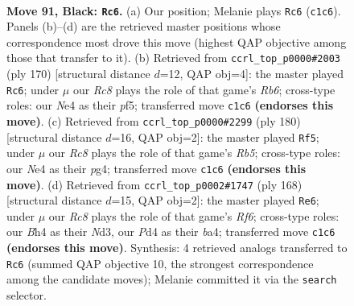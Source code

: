 \documentclass[11pt]{article}
\begin{document}
\clearpage

\begin{figure}[p]\centering
\begin{subfigure}{0.46\textwidth}\centering
\resizebox{\linewidth}{!}{%
\newchessgame
\chessboard[
  setfen={R7/8/4k2p/4p3/1K1pn2b/8/8/2r5 b - - 1 91},
  showmover=false,
  pgfstyle=straightmove, color=movearrow, markmove={c1-c6}
]}
\caption{}
\end{subfigure}\hfill
\begin{subfigure}{0.46\textwidth}\centering
\resizebox{\linewidth}{!}{%
\newchessgame
\chessboard[
  setfen={8/6k1/1R6/5p2/5P2/4P3/5K2/r7 w - - 49 86},
  showmover=false,
  pgfstyle=straightmove, color=movearrow, markmove={b6-c6}
]}
\caption{}
\end{subfigure}
\\[4pt]
\begin{subfigure}{0.46\textwidth}\centering
\resizebox{\linewidth}{!}{%
\newchessgame
\chessboard[
  setfen={8/8/7k/1R6/6p1/4K1P1/5P2/r7 w - - 86 91},
  showmover=false,
  pgfstyle=straightmove, color=movearrow, markmove={b5-f5}
]}
\caption{}
\end{subfigure}\hfill
\begin{subfigure}{0.46\textwidth}\centering
\resizebox{\linewidth}{!}{%
\newchessgame
\chessboard[
  setfen={8/2k5/5R2/8/bPK5/P2N4/8/7r w - - 35 85},
  showmover=false,
  pgfstyle=straightmove, color=movearrow, markmove={f6-e6}
]}
\caption{}
\end{subfigure}
\caption{\textbf{Move 91, Black: \texttt{Rc6}.} (a) Our position; Melanie plays \texttt{Rc6} (\texttt{c1c6}). Panels (b)--(d) are the retrieved master positions whose correspondence most drove this move (highest QAP objective among those that transfer to it). (b) Retrieved from \texttt{ccrl\_top\_p0000\#2003} (ply 170) [structural distance $d$=12, QAP obj=4]: the master played \texttt{Rc6}; under $\mu$ our \emph{Rc8} plays the role of that game's \emph{Rb6}; cross-type roles: our \emph{N}e4 as their \emph{p}f5; transferred move \texttt{c1c6} \textbf{(endorses this move)}. (c) Retrieved from \texttt{ccrl\_top\_p0000\#2299} (ply 180) [structural distance $d$=16, QAP obj=2]: the master played \texttt{Rf5}; under $\mu$ our \emph{Rc8} plays the role of that game's \emph{Rb5}; cross-type roles: our \emph{N}e4 as their \emph{p}g4; transferred move \texttt{c1c6} \textbf{(endorses this move)}. (d) Retrieved from \texttt{ccrl\_top\_p0002\#1747} (ply 168) [structural distance $d$=15, QAP obj=2]: the master played \texttt{Re6}; under $\mu$ our \emph{Rc8} plays the role of that game's \emph{Rf6}; cross-type roles: our \emph{B}h4 as their \emph{N}d3, our \emph{P}d4 as their \emph{b}a4; transferred move \texttt{c1c6} \textbf{(endorses this move)}. Synthesis: 4 retrieved analogs transferred to \texttt{Rc6} (summed QAP objective 10, the strongest correspondence among the candidate moves); Melanie committed it via the \texttt{search} selector.}
\label{fig:thought-m181}
\end{figure}
\end{document}

